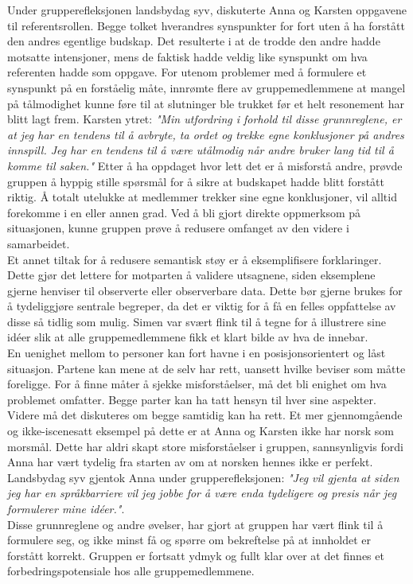 Under grupperefleksjonen landsbydag syv, diskuterte Anna og Karsten oppgavene til referentsrollen.
Begge tolket hverandres synspunkter for fort uten å ha forstått den andres egentlige budskap.
Det resulterte i at de trodde den andre hadde motsatte intensjoner, mens de faktisk hadde veldig like synspunkt om hva referenten hadde som oppgave. 
For utenom problemer med å formulere et synspunkt på en forståelig måte, innrømte flere av gruppemedlemmene at mangel på tålmodighet kunne føre til at slutninger ble trukket før et helt resonement har blitt lagt frem. 
Karsten ytret: \emph{"Min utfordring i forhold til disse grunnreglene, er at jeg har en tendens til å avbryte, ta ordet og trekke egne konklusjoner på andres innspill. Jeg har en tendens til å være utålmodig når andre bruker lang tid til å komme til saken."}
Etter å ha oppdaget hvor lett det er å misforstå andre, prøvde gruppen å hyppig stille spørsmål for å sikre at budskapet hadde blitt forstått riktig.
Å totalt utelukke at medlemmer trekker sine egne konklusjoner, vil alltid forekomme i en eller annen grad.
Ved å bli gjort direkte oppmerksom på situasjonen, kunne gruppen prøve å redusere omfanget av den videre i samarbeidet. \\

Et annet tiltak for å redusere semantisk støy er å eksemplifisere forklaringer.
Dette gjør det lettere for motparten å validere utsagnene, siden eksemplene gjerne henviser til observerte eller observerbare data.
Dette bør gjerne brukes for å tydeliggjøre sentrale begreper, da det er viktig for å få en felles oppfattelse av disse så tidlig som mulig.
Simen var svært flink til å tegne for å illustrere sine idéer slik at alle gruppemedlemmene fikk et klart bilde av hva de innebar. \\

En uenighet mellom to personer kan fort havne i en posisjonsorientert og låst situasjon.
Partene kan mene at de selv har rett, uansett hvilke beviser som måtte foreligge.
For å finne måter å sjekke misforståelser, må det bli enighet om hva problemet omfatter. Begge parter kan ha tatt hensyn til hver sine aspekter.
Videre må det diskuteres om begge samtidig kan ha rett.
Et mer gjennomgående og ikke-iscenesatt eksempel på dette er at Anna og Karsten ikke har norsk som morsmål.
Dette har aldri skapt store misforståelser i gruppen, sannsynligvis fordi Anna har vært tydelig fra starten av om at norsken hennes ikke er perfekt.
Landsbydag syv gjentok Anna under grupperefleksjonen: \emph{"Jeg vil gjenta at siden jeg har en språkbarriere vil jeg jobbe for å være enda tydeligere og presis når jeg formulerer mine idéer."}. \\

Disse grunnreglene og andre øvelser, har gjort at gruppen har vært flink til å formulere seg, og ikke minst få og spørre om bekreftelse på at innholdet er forstått korrekt.
Gruppen er fortsatt ydmyk og fullt klar over at det finnes et forbedringspotensiale hos alle gruppemedlemmene.
